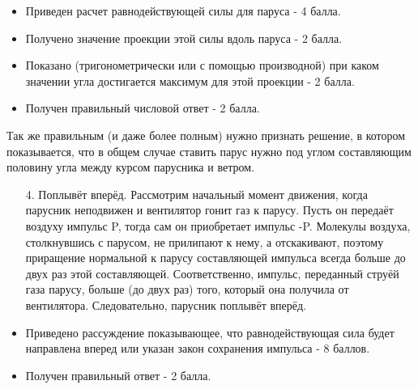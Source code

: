 \additionalCriteria

\begin{itemize}
    \item Приведен расчет равнодействующей силы для паруса - 4 балла.
    \item Получено значение проекции этой силы вдоль паруса - 2 балла.
    \item Показано (тригонометрически или с помощью производной) при каком значении угла достигается 
    максимум для этой проекции - 2 балла.
    \item Получен правильный числовой ответ - 2 балла.
\end{itemize}

Так же правильным (и даже более полным) нужно признать решение, в котором показывается, что в общем 
случае ставить парус нужно под углом составляющим половину угла между курсом парусника и ветром.

\begin{enumerate}
    \item[4.] Поплывёт вперёд. Рассмотрим начальный момент движения, когда парусник неподвижен и вентилятор гонит газ к парусу. Пусть он передаёт воздуху импульс P, тогда сам он приобретает импульс -P.  Молекулы воздуха, столкнувшись с парусом, не прилипают к нему, а отскакивают, поэтому приращение нормальной к парусу составляющей импульса всегда больше до двух раз этой составляющей. Соответственно, импульс, переданный струёй газа парусу, больше (до двух раз) того, который она получила от вентилятора. 
    Следовательно, парусник поплывёт вперёд.

\end{enumerate}

\additionalCriteria

\begin{itemize}
    \item Приведено рассуждение показывающее, что равнодействующая сила будет направлена вперед или указан закон сохранения импульса - 8 баллов.
    \item Получен правильный ответ - 2 балла.
\end{itemize}

